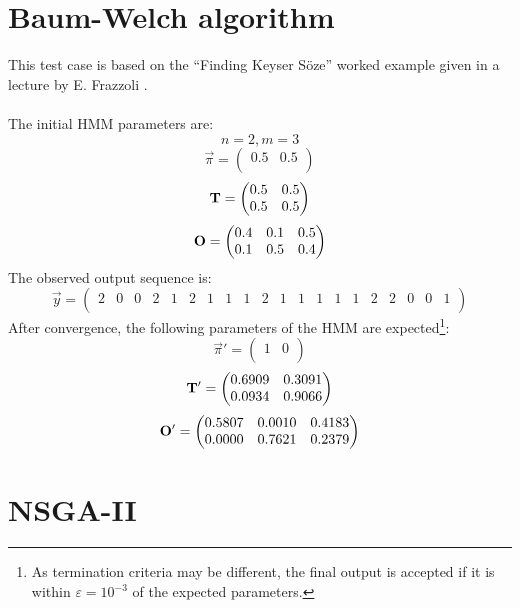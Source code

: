 \documentclass[12pt,a4paper,twoside,openright]{report}
\begin{document}
\section{Baum-Welch algorithm}

This test case is based on the ``Finding Keyser S\"{o}ze'' worked example given in a lecture by E. Frazzoli \cite{FrazzoliMIT}.\\ \\
The initial HMM parameters are:
\[n = 2, m = 3\]
\[{\vec{\pi}} = \left(\begin{matrix}
 0.5 & 0.5\\	
 \end{matrix}\right)
\]
\[{\bf T} = \left(\begin{matrix}
 0.5 & 0.5\\
 0.5 & 0.5\\	
 \end{matrix}\right)
\]
\[{\bf O} = \left(\begin{matrix}
 0.4 & 0.1 & 0.5\\
 0.1 & 0.5 & 0.4\\	
 \end{matrix}\right)
\]
The observed output sequence is:
\[\vec{y} = \left(\begin{array}{cccccccccccccccccccc}
 2 & 0 & 0 & 2 & 1 & 2 & 1 & 1 & 1 & 2 & 1 & 1 & 1 & 1 & 1 & 2 & 2 & 0 & 0 & 1\\	
 \end{array}\right)
\]
After convergence, the following parameters of the HMM are expected\footnote{As termination criteria may be different, the final output is accepted if it is within $\varepsilon=10^{-3}$ of the expected parameters.}:
\[{\vec{\pi}'} = \left(\begin{matrix}
 1 & 0\\	
 \end{matrix}\right)
\]
\[{\bf T'} = \left(\begin{matrix}
 0.6909 & 0.3091\\
 0.0934 & 0.9066\\	
 \end{matrix}\right)
\]
\[{\bf O'} = \left(\begin{matrix}
 0.5807 & 0.0010 & 0.4183\\
 0.0000 & 0.7621 & 0.2379\\	
 \end{matrix}\right)
\]

\section{NSGA-II}
\end{document}
